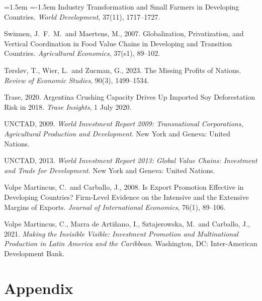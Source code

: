 \documentclass[11pt,a4paper]{article}
\begin{document}
\begin{list}{}{\leftmargin=1.5em \itemindent=-1.5em \itemsep=2pt \topsep=4pt}
Industry Transformation and Small Farmers in Developing Countries. \emph{World Development}, 37(11),
1717--1727.
\item Swinnen, J.\ F.\ M.\ and Maertens, M., 2007. Globalization, Privatization, and Vertical
Coordination in Food Value Chains in Developing and Transition Countries. \emph{Agricultural
Economics}, 37(s1), 89--102.
\item T{\o}rsl{\o}v, T., Wier, L.\ and Zucman, G., 2023. The Missing Profits of Nations.
\emph{Review of Economic Studies}, 90(3), 1499--1534.
\item Trase, 2020. Argentina Crushing Capacity Drives Up Imported Soy Deforestation Risk in 2018.
\emph{Trase Insights}, 1 July 2020.
\item UNCTAD, 2009. \emph{World Investment Report 2009: Transnational Corporations, Agricultural
Production and Development}. New York and Geneva: United Nations.
\item UNCTAD, 2013. \emph{World Investment Report 2013: Global Value Chains: Investment and Trade for
Development}. New York and Geneva: United Nations.
\item Volpe Martincus, C.\ and Carballo, J., 2008. Is Export Promotion Effective in Developing
Countries? Firm-Level Evidence on the Intensive and the Extensive Margins of Exports.
\emph{Journal of International Economics}, 76(1), 89--106.
\item Volpe Martincus, C., Marra de Arti\~nano, I., Sztajerowska, M.\ and Carballo, J., 2021.
\emph{Making the Invisible Visible: Investment Promotion and Multinational Production in Latin
America and the Caribbean}. Washington, DC: Inter-American Development Bank.
\end{list}

\clearpage
\appendix
\setcounter{figure}{0}
\setcounter{table}{0}
\renewcommand{\thesubsection}{A.\arabic{subsection}}
\section*{Appendix}\label{sec:app}
\end{document}
